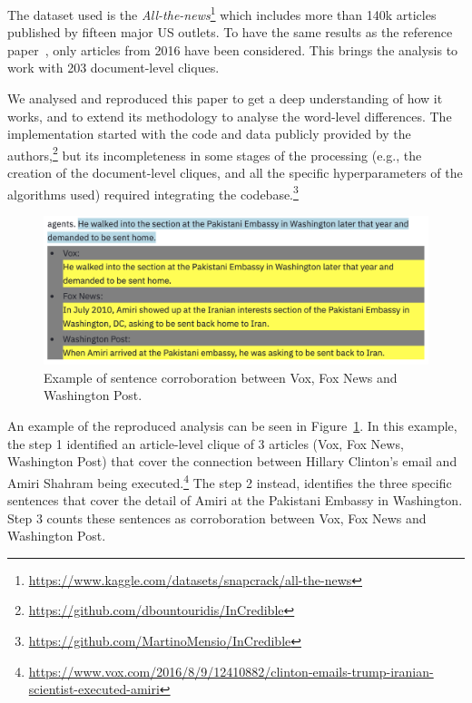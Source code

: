 The dataset used is the \emph{All-the-news}\footnote{\url{https://www.kaggle.com/datasets/snapcrack/all-the-news}} which includes more than 140k articles published by fifteen major US outlets. To have the same results as the reference paper~\citep{bountouridis2018explaining}, only articles from 2016 have been considered. This brings the analysis to work with 203 document-level cliques. 

We analysed and reproduced this paper to get a deep understanding of how it works, and to extend its methodology to analyse the word-level differences. %
The implementation started with the code and data %
publicly provided by the authors,\footnote{\url{https://github.com/dbountouridis/InCredible}} but its incompleteness in some stages of the processing (e.g., the creation of the document-level cliques, and all the specific hyperparameters of the algorithms used) required integrating the codebase.\footnote{\url{https://github.com/MartinoMensio/InCredible}}

\begin{figure}[!htbp]
    \centering
    \includegraphics[width=\linewidth]{figures/cluster_similar_sentences_amiri.png}
    \caption{Example of sentence corroboration between Vox, Fox News and Washington Post.}
    \label{fig:cluster_similar_sentences_amiri}
\end{figure}%

An example of the reproduced analysis can be seen in Figure~\ref{fig:cluster_similar_sentences_amiri}.
In this example, the step 1 identified an article-level clique of 3 articles (Vox, Fox News, Washington Post) that cover the connection between Hillary Clinton's email and Amiri Shahram being executed.\footnote{\url{https://www.vox.com/2016/8/9/12410882/clinton-emails-trump-iranian-scientist-executed-amiri}}
The step 2 instead, identifies the three specific sentences that cover the detail of Amiri at the Pakistani Embassy in Washington.
Step 3 counts these sentences as corroboration between Vox, Fox News and Washington Post. 

